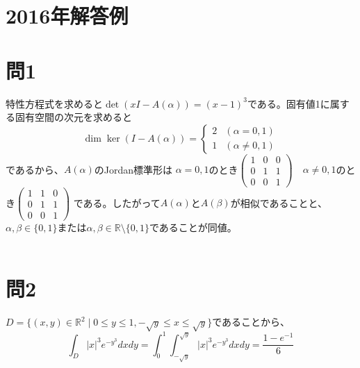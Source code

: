 ﻿\documentclass{jsarticle}
\begin{document}
\newpage
\section*{2016年解答例}
\section*{問1}
特性方程式を求めると$\det(xI - A(\alpha)) = (x - 1)^3$である。固有値1に属する固有空間の次元を求めると
$$
\dim \ker(I - A(\alpha))= \begin{cases} 2 & (\alpha = 0, 1) \\ 1 & (\alpha \neq 0,1) \end{cases}
$$
であるから、$A(\alpha)$のJordan標準形は
$\alpha = 0,1$のとき$\begin{pmatrix} 1 &0 &0 \\ 0 &1&1 \\ 0&0 &1  \end{pmatrix} $\ \
$\alpha \neq 0,1$のとき$\begin{pmatrix} 1 &1&0 \\ 0 &1&1 \\ 0&0 &1  \end{pmatrix}$
である。したがって$A(\alpha)$と$A(\beta)$が相似であることと、$\alpha, \beta \in \{ 0,1 \}$または$\alpha, \beta \in \mathbb{R} \setminus \{ 0,1 \}$であることが同値。\\ \\

\section*{問2}
\noindent
$D =\{(x, y) \in \mathbb{R}^2 \mid 0 \leq y \leq 1, -\sqrt{y} \leq x \leq \sqrt{y} \}$であることから、
$$
\int_{D} |x|^3 e^{- y^3}dxdy =\int_{0}^{1} \int_{-\sqrt{y}}^{\sqrt{y}}  |x|^3 e^{- y^3}dxdy = \frac{1 - e^{-1}}{6}
$$ \\ \\
\end{document}
